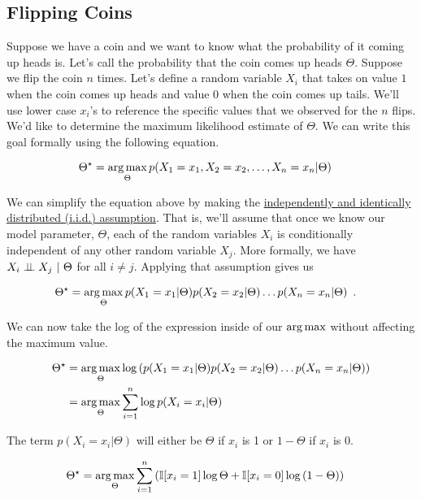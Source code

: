 \documentclass{tufte-handout}
\begin{document}
\subsection{Flipping Coins}

Suppose we have a coin and we want to know what the probability of it coming up heads is.  Let's call the probability that the coin comes up heads $\Theta$.  Suppose we flip the coin $n$ times.  Let's define a random variable $X_i$ that takes on value $1$ when the coin comes up heads and value $0$ when the coin comes up tails.  We'll use lower case $x_i$'s to reference the specific values that we observed for the $n$ flips.  We'd like to determine the maximum likelihood estimate of $\Theta$.  We can write this goal formally using the following equation.


\begin{align}
\Theta^\star &= \operatorname*{arg\,max}_{\Theta} p(X_1 = x_1, X_2 = x_2, \ldots, X_n = x_n | \Theta)
\end{align} 

We can simplify the equation above by making the \href{https://en.wikipedia.org/wiki/Independent_and_identically_distributed_random_variables}{independently and identically distributed (i.i.d.) assumption}.  That is, we'll assume that once we know our model parameter, $\Theta$, each of the random variables $X_i$ is conditionally independent of any other random variable $X_j$.  More formally, we have $X_i \perp\!\!\!\perp X_j~|~\Theta$ for all $i \neq j$.  Applying that assumption gives us

\begin{align}
\Theta^\star &= \operatorname*{arg\,max}_{\Theta} p(X_1 = x_1 | \Theta) p(X_2 = x_2 | \Theta) \ldots p(X_n = x_n | \Theta) \enspace .
\end{align}

We can now take the log of the expression inside of our $\operatorname*{arg\,max}$ without affecting the maximum value.


\begin{align}
\Theta^\star &= \operatorname*{arg\,max}_{\Theta} \log \left ( p(X_1 = x_1 | \Theta) p(X_2 = x_2 | \Theta) \ldots p(X_n = x_n | \Theta) \right) \nonumber \\
&= \operatorname*{arg\,max}_{\Theta} \sum_{i=1}^n \log  p(X_i = x_i | \Theta)
\end{align}

The term $p(X_i = x_i | \Theta)$ will either be $\Theta$ if $x_i$ is 1 or $1-\Theta$ if $x_i$ is 0.

\begin{align}
\Theta^\star &= \operatorname*{arg\,max}_{\Theta} \sum_{i=1}^n \left ( \mathbb{I} [ x_i =1] \log \Theta  + \mathbb{I}[x_i = 0]  \log\left (1-  \Theta \right) \right) \label{eq:mlecoin}
\end{align}
\end{document}
